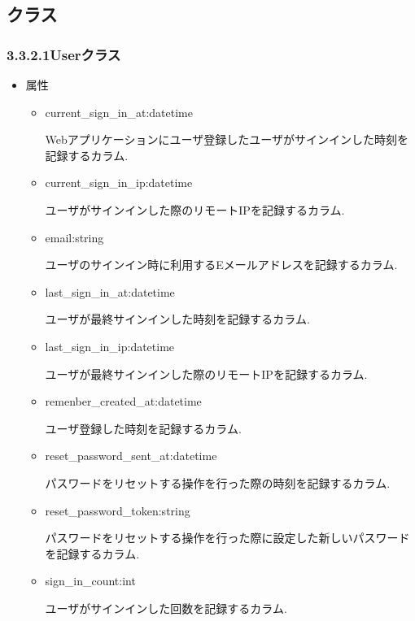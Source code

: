\subsection{クラス}
\subsubsection{3.3.2.1Userクラス}
\begin{itemize}
\item 属性

\begin{itemize}
\item current\_sign\_in\_at:datetime

Webアプリケーションにユーザ登録したユーザがサインインした時刻を記録するカラム.

\item current\_sign\_in\_ip:datetime

ユーザがサインインした際のリモートIPを記録するカラム.

\item email:string

ユーザのサインイン時に利用するEメールアドレスを記録するカラム.

\item last\_sign\_in\_at:datetime

ユーザが最終サインインした時刻を記録するカラム.

\item last\_sign\_in\_ip:datetime

ユーザが最終サインインした際のリモートIPを記録するカラム.

\item remenber\_created\_at:datetime

ユーザ登録した時刻を記録するカラム.

\item reset\_password\_sent\_at:datetime

パスワードをリセットする操作を行った際の時刻を記録するカラム.

\item reset\_password\_token:string

パスワードをリセットする操作を行った際に設定した新しいパスワードを記録するカラム.

\item sign\_in\_count:int

ユーザがサインインした回数を記録するカラム.
\end{itemize}

\end{itemize}

